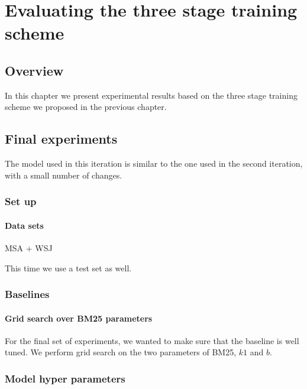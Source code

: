 \chapter{Evaluating the three stage training scheme}
\label{chap:results}



\section{Overview}

In this chapter we present experimental results based on the three stage training scheme we proposed in the previous chapter. 





\section{Final experiments}
The model used in this iteration is similar to the one used in the second iteration, with a small number of changes.


\subsection{Set up}

\subsubsection{Data sets}

MSA + WSJ

This time we use a test set as well.

\subsection{Baselines}




\subsubsection{Grid search over BM25 parameters}

For the final set of experiments, we wanted to make sure that the baseline is well tuned. We perform grid search on the two parameters of BM25, $k1$ and $b$. 







\subsection{Model hyper parameters}







